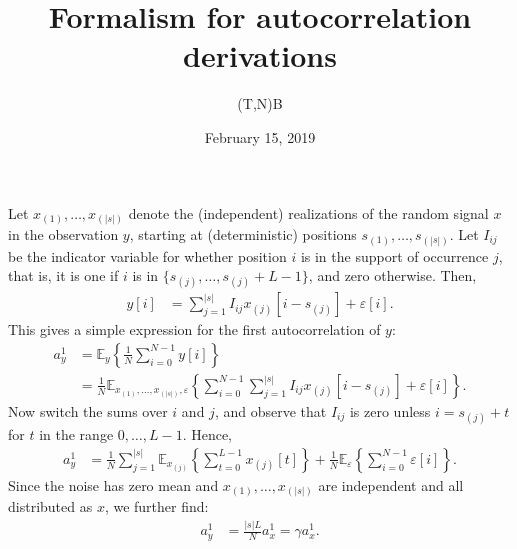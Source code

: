 \documentclass[12pt]{article}
\title{Formalism for autocorrelation derivations}
\author{(T,N)B}
\date{February 15, 2019}
\newcommand{\E}{\mathbb{E}}
\begin{document}
\maketitle

Let $x_{(1)}, \ldots, x_{(|s|)}$ denote the (independent) realizations of the random signal $x$ in the observation $y$, starting at (deterministic) positions $s_{(1)}, \ldots, s_{(|s|)}$. Let $I_{ij}$ be the indicator variable for whether position $i$ is in the support of occurrence $j$, that is, it is one if $i$ is in $\{s_{(j)}, \ldots, s_{(j)}+L-1\}$, and zero otherwise. Then,
\begin{align}
	y[i] & = \sum_{j = 1}^{|s|} I_{ij} x_{(j)}[i-s_{(j)}] + \varepsilon[i].
	\label{eq:explicityiindicators}
\end{align}
This gives a simple expression for the first autocorrelation of $y$:
\begin{align}
	a_y^1 & = \E_y\left\{ \frac{1}{N} \sum_{i = 0}^{N-1} y[i] \right\} \\
		  & = \frac{1}{N} \E_{x_{(1)}, \ldots, x_{(|s|)}, \varepsilon}\left\{ \sum_{i = 0}^{N-1} \sum_{j = 1}^{|s|} I_{ij} x_{(j)}[i-s_{(j)}] + \varepsilon[i] \right\}.
\end{align}
Now switch the sums over $i$ and $j$, and observe that $I_{ij}$ is zero unless $i = s_{(j)} + t$ for $t$ in the range $0, \ldots, L-1$. Hence,
\begin{align}
	a_y^1 & = \frac{1}{N} \sum_{j = 1}^{|s|} \E_{x_{(j)}}\left\{ \sum_{t = 0}^{L-1} x_{(j)}[t]\right\} + \frac{1}{N} \E_\varepsilon\left\{ \sum_{i=0}^{N-1} \varepsilon[i]\right\}.
\end{align}
Since the noise has zero mean and $x_{(1)}, \ldots, x_{(|s|)}$ are independent and all distributed as $x$, we further find:
\begin{align}
	a_y^1 & = \frac{|s|L}{N} a_x^1 = \gamma a_x^1.
\end{align}
\end{document}
